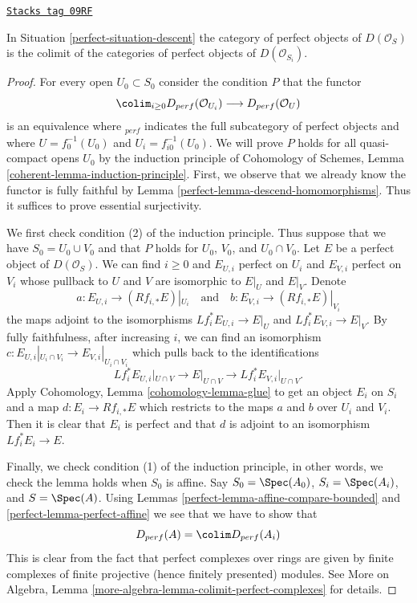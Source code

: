 \begin{lemma}
\label{perfect-lemma-descend-perfect}
\href{https://stacks.math.columbia.edu/tag/09RF}{\texttt{Stacks tag 09RF}}

In Situation \ref{perfect-situation-descent} the category of perfect
objects of $D(\mathcal{O}_S)$ is the colimit of the categories
of perfect objects of $D(\mathcal{O}_{S_i})$.
\end{lemma}

\begin{proof}

For every open $U_0 \subset S_0$ consider the condition $P$ that
the functor
$$
\colim_{i \geq 0} D_{perf}(\mathcal{O}_{U_i})
\longrightarrow
D_{perf}(\mathcal{O}_U)
$$
is an equivalence where ${}_{perf}$ indicates the full subcategory of
perfect objects and where $U = f_0^{-1}(U_0)$ and $U_i = f_{i0}^{-1}(U_0)$.
We will prove $P$ holds for all quasi-compact opens $U_0$
by the induction principle of
Cohomology of Schemes, Lemma \ref{coherent-lemma-induction-principle}.
First, we observe that we already know the functor is fully faithful
by Lemma \ref{perfect-lemma-descend-homomorphisms}. Thus it suffices to prove
essential surjectivity.

\medskip\noindent
We first check condition (2) of the induction principle. Thus suppose
that we have $S_0 = U_0 \cup V_0$ and that $P$ holds for
$U_0$, $V_0$, and $U_0 \cap V_0$. Let $E$ be a perfect object
of $D(\mathcal{O}_S)$. We can find $i \geq 0$ and $E_{U, i}$ perfect on $U_i$
and $E_{V, i}$ perfect on $V_i$ whose pullback to $U$ and $V$ are isomorphic
to $E|_U$ and $E|_V$. Denote
$$
a : E_{U, i} \to (Rf_{i, *}E)|_{U_i}
\quad\text{and}\quad
b : E_{V, i} \to (Rf_{i, *}E)|_{V_i}
$$
the maps adjoint to the isomorphisms $Lf_i^*E_{U, i} \to E|_U$
and $Lf_i^*E_{V, i} \to E|_V$.
By fully faithfulness, after increasing $i$,
we can find an isomorphism
$c : E_{U, i}|_{U_i \cap V_i} \to E_{V, i}|_{U_i \cap V_i}$
which pulls back to the identifications
$$
Lf_i^*E_{U, i}|_{U \cap V} \to E|_{U \cap V} \to Lf_i^*E_{V, i}|_{U \cap V}.
$$
Apply Cohomology, Lemma \ref{cohomology-lemma-glue}
to get an object $E_i$ on $S_i$ and a map $d : E_i \to Rf_{i, *}E$
which restricts to the maps $a$ and $b$ over $U_i$ and $V_i$.
Then it is clear that $E_i$ is perfect and that
$d$ is adjoint to an isomorphism $Lf_i^*E_i \to E$.

\medskip\noindent
Finally, we check condition (1) of the induction principle, in other
words, we check the lemma holds when $S_0$ is affine.
Say $S_0 = \Spec(A_0)$, $S_i = \Spec(A_i)$, and
$S = \Spec(A)$. Using Lemmas \ref{perfect-lemma-affine-compare-bounded}
and \ref{perfect-lemma-perfect-affine} we see that we have to show that
$$
D_{perf}(A) = \colim D_{perf}(A_i)
$$
This is clear from the fact that perfect complexes over rings are
given by finite complexes of finite projective (hence finitely presented)
modules. See More on Algebra, Lemma
\ref{more-algebra-lemma-colimit-perfect-complexes} for details.
\end{proof}

